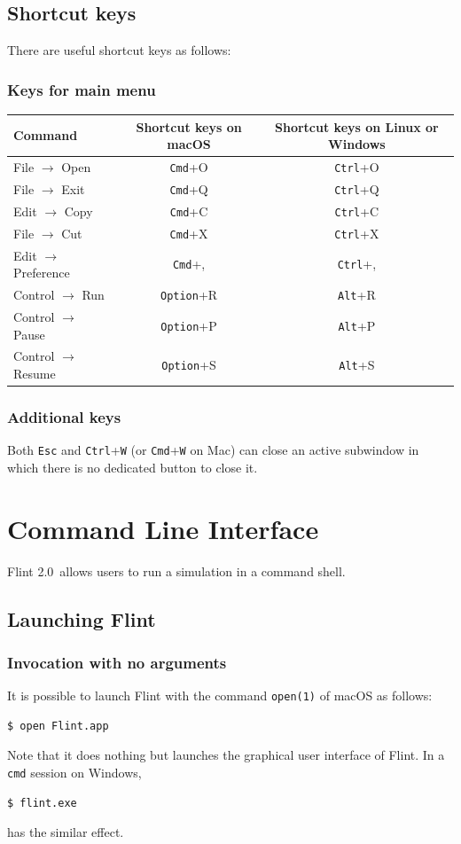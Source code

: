 \documentclass[a4paper,10pt]{report}
\def\FlintVersion{2.0}
\def\Flint{Flint \FlintVersion}
\begin{document}
\section{Shortcut keys}
There are useful shortcut keys as follows:

\subsection{Keys for main menu}
\begin{tabular}{l||c|c}
  Command & Shortcut keys on macOS & Shortcut keys on Linux or Windows\\
  \hline
  File $\rightarrow$ Open & {\tt Cmd}+O & {\tt Ctrl}+O \\
  File $\rightarrow$ Exit & {\tt Cmd}+Q & {\tt Ctrl}+Q \\
  Edit $\rightarrow$ Copy & {\tt Cmd}+C & {\tt Ctrl}+C \\
  File $\rightarrow$ Cut  & {\tt Cmd}+X & {\tt Ctrl}+X \\
  Edit $\rightarrow$ Preference & {\tt Cmd}+, & {\tt Ctrl}+, \\
  Control $\rightarrow$ Run & {\tt Option}+R & {\tt Alt}+R \\
  Control $\rightarrow$ Pause & {\tt Option}+P & {\tt Alt}+P \\
  Control $\rightarrow$ Resume & {\tt Option}+S & {\tt Alt}+S \\
\end{tabular}

\subsection{Additional keys}
Both {\tt Esc} and {\tt Ctrl}+{\tt W} (or {\tt Cmd}+{\tt W} on Mac) can close an active
subwindow in which there is no dedicated button to close it.


\chapter{Command Line Interface}
\Flint\ allows users to run a simulation in a command shell.

\section{Launching Flint}

\subsection{Invocation with no arguments}
It is possible to launch Flint with the command {\tt open(1)} of macOS as follows:
\begin{verbatim}
$ open Flint.app
\end{verbatim}
Note that it does nothing but launches the graphical user interface of Flint.
In a {\tt cmd} session on Windows,
\begin{verbatim}
$ flint.exe
\end{verbatim}
has the similar effect.
\end{document}
